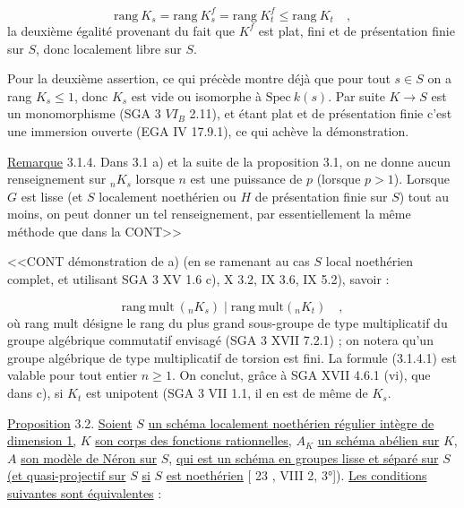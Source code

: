 \begin{equation*}
\mathrm{rang}\ K_{s} = \mathrm{rang}\ K^{f}_{s} = \mathrm{rang}\ K^{f}_{t} \leq \mathrm{rang}\ K_{t} \quad ,
\end{equation*}
la deuxième égalité provenant du fait que $K^{f}$ est plat, fini et de présentation finie sur $S$, donc localement libre sur $S$.

Pour la deuxième assertion, ce qui précède montre déjà que pour tout $s \in S$ on a rang $K_{s} \leq 1$, donc $K_{s}$ est vide ou isomorphe à $\mathrm{Spec}\ k(s)$. Par suite $K \longrightarrow S$ est un monomorphisme (SGA 3 $VI_{B}$ 2.11), et étant plat et de présentation finie c'est une immersion ouverte (EGA IV 17.9.1), ce qui achève la démonstration.

\underline{Remarque} 3.1.4. Dans 3.1 a) et la suite de la proposition 3.1, on ne donne aucun renseignement sur ${}_{n}K_{s}$ lorsque $n$ est une puissance de $p$ (lorsque $p > 1$). Lorsque $G$ est lisse (et $S$ localement noethérien ou $H$ de présentation finie sur $S$) tout au moins, on peut donner un tel renseignement, par essentiellement la même méthode que dans la CONT>>



<<CONT démonstration de a) (en se ramenant au cas $S$ local noethérien complet, et utilisant SGA 3 XV 1.6 c), X 3.2, IX 3.6, IX 5.2), savoir :

\begin{equation}\tag{3.1.4.1}
\mathrm{rang\ mult}\ ({}_n K_s) \mid \mathrm{rang\ mult}({}_n K_t) \quad ,
\end{equation}
où rang mult désigne le rang du plus grand sous-groupe de type multiplicatif du groupe algébrique commutatif envisagé (SGA 3 XVII 7.2.1) ; on notera qu'un groupe algébrique de type multiplicatif de torsion est fini. La formule (3.1.4.1) est valable pour tout entier $n \geq 1$. On conclut, grâce à SGA XVII 4.6.1 (vi), que dans c), si $K_t$ est unipotent (SGA 3 VII 1.1, il en est de même de $K_s$.

\underline{Proposition} 3.2. \underline{Soient} $S$ \underline{un schéma localement noethérien régulier intègre de dimension 1,} $K$ \underline{son corps des fonctions rationnelles,} $A_K$ \underline{un schéma abélien sur} $K$, $A$ \underline{son modèle de Néron sur} $S$, \underline{qui est un schéma en groupes lisse et séparé sur} $S$ \underline{(et quasi-projectif sur} $S$ \underline{si} $S$ \underline{est noethérien} [ 23 , VIII 2, 3°]). \underline{Les conditions suivantes sont équivalentes} :


